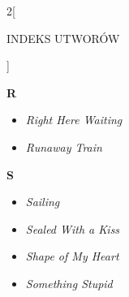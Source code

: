 \documentclass[a4paper]{report}
\begin{document}
\begin{multicols*}{2}[\begin{Huge}INDEKS UTWORÓW\end{Huge}\vspace{1cm}]
\begin{minipage}{\columnwidth}
\begin{itemize}[topsep=6pt, after=\vspace{5mm}, leftmargin=0mm]
	\end{itemize}
\end{minipage}
\begin{minipage}{\columnwidth}
\begin{Large}
		\textbf{R}
	\end{Large} 
	\begin{itemize}[topsep=6pt, after=\vspace{5mm}, leftmargin=0mm]
		\itemsep0em
		\item[]\textit{Right Here Waiting}  \\
		\item[]  \textit{Runaway Train}  \\
	\end{itemize}
\end{minipage}
\begin{minipage}{\columnwidth}
\begin{Large}
		\textbf{S}
	\end{Large} 
	\begin{itemize}[topsep=6pt, after=\vspace{1.5mm}, leftmargin=0mm]
		\itemsep0em
		\item[]\textit{Sailing}  \\
		\item[]  \textit{Sealed With a Kiss}  \\
	\end{itemize}
\end{minipage}
\begin{minipage}{\columnwidth}
	\begin{itemize}[topsep=6pt, after=\vspace{1.5mm}, leftmargin=0mm]
		\itemsep0em
		\item[]  \textit{Shape of My Heart}  \\
	\end{itemize}
\end{minipage}
\begin{minipage}{\columnwidth}
	\begin{itemize}[topsep=6pt, after=\vspace{1.5mm}, leftmargin=0mm]
		\itemsep0em
		\item[]  \textit{Something Stupid}  \\
	\end{itemize}
\end{minipage}
\begin{minipage}{\columnwidth}
	\begin{itemize}[topsep=6pt, after=\vspace{1.5mm}, leftmargin=0mm]

\end{itemize}
\end{minipage}
\end{multicols*}
\end{document}
